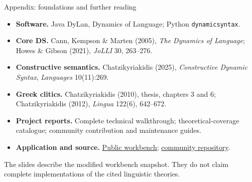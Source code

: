 \documentclass[aspectratio=169,11pt]{beamer}
\newcommand{\aside}[1]{\par{\small\color{Muted}#1}\par}
\newcommand{\code}[1]{\texttt{#1}}
\begin{document}
\begin{frame}{Appendix: foundations and further reading}
  \color{Ink}
  \small
  \begin{itemize}\setlength\itemsep{6pt}
    \item \textbf{Software.} Java DyLan, Dynamics of Language; Python
      \code{dynamicsyntax}.
    \item \textbf{Core DS.} Cann, Kempson \& Marten (2005), \emph{The Dynamics of Language}; Howes \& Gibson (2021), \emph{JoLLI} 30, 263–276.
    \item \textbf{Constructive semantics.} Chatzikyriakidis (2025),
      \emph{Constructive Dynamic Syntax}, \emph{Languages} 10(11):269.
    \item \textbf{Greek clitics.} Chatzikyriakidis (2010), thesis, chapters 3 and 6;
      Chatzikyriakidis (2012), \emph{Lingua} 122(6), 642–672.
    \item \textbf{Project reports.} Complete technical walkthrough; theoretical-coverage catalogue; community contribution and maintenance guides.
    \item \textbf{Application and source.} \href{https://ds-workbench.vercel.app/}{Public workbench};
      \href{https://github.com/StergiosCha/DS_workbench}{community repository}.
  \end{itemize}
  \vspace{1mm}
  \aside{The slides describe the modified workbench snapshot. They do not claim complete implementations of the cited linguistic theories.}
\end{frame}
\end{document}
